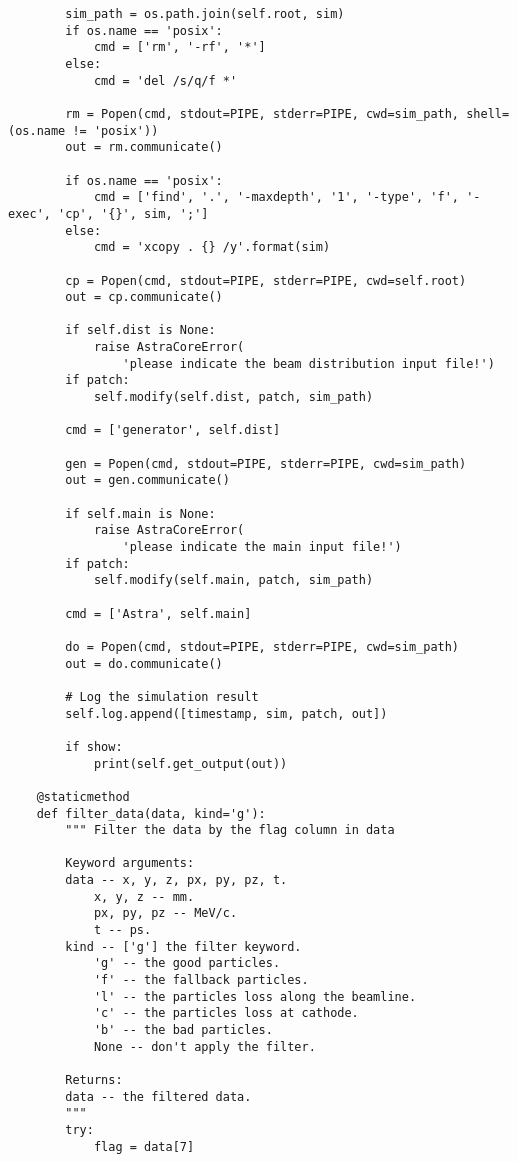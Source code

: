 \begin{footnotesize}
\begin{verbatim}
        sim_path = os.path.join(self.root, sim)
        if os.name == 'posix':
            cmd = ['rm', '-rf', '*']
        else:
            cmd = 'del /s/q/f *'

        rm = Popen(cmd, stdout=PIPE, stderr=PIPE, cwd=sim_path, shell=(os.name != 'posix'))
        out = rm.communicate()

        if os.name == 'posix':
            cmd = ['find', '.', '-maxdepth', '1', '-type', 'f', '-exec', 'cp', '{}', sim, ';']
        else:
            cmd = 'xcopy . {} /y'.format(sim)

        cp = Popen(cmd, stdout=PIPE, stderr=PIPE, cwd=self.root)
        out = cp.communicate()

        if self.dist is None:
            raise AstraCoreError(
                'please indicate the beam distribution input file!')
        if patch:
            self.modify(self.dist, patch, sim_path)

        cmd = ['generator', self.dist]

        gen = Popen(cmd, stdout=PIPE, stderr=PIPE, cwd=sim_path)
        out = gen.communicate()

        if self.main is None:
            raise AstraCoreError(
                'please indicate the main input file!')
        if patch:
            self.modify(self.main, patch, sim_path)

        cmd = ['Astra', self.main]

        do = Popen(cmd, stdout=PIPE, stderr=PIPE, cwd=sim_path)
        out = do.communicate()

        # Log the simulation result
        self.log.append([timestamp, sim, patch, out])

        if show:
            print(self.get_output(out))

    @staticmethod
    def filter_data(data, kind='g'):
        """ Filter the data by the flag column in data

        Keyword arguments:
        data -- x, y, z, px, py, pz, t.
            x, y, z -- mm.
            px, py, pz -- MeV/c.
            t -- ps.
        kind -- ['g'] the filter keyword.
            'g' -- the good particles.
            'f' -- the fallback particles.
            'l' -- the particles loss along the beamline.
            'c' -- the particles loss at cathode.
            'b' -- the bad particles.
            None -- don't apply the filter.

        Returns:
        data -- the filtered data.
        """
        try:
            flag = data[7]


\end{verbatim}
\end{footnotesize}
